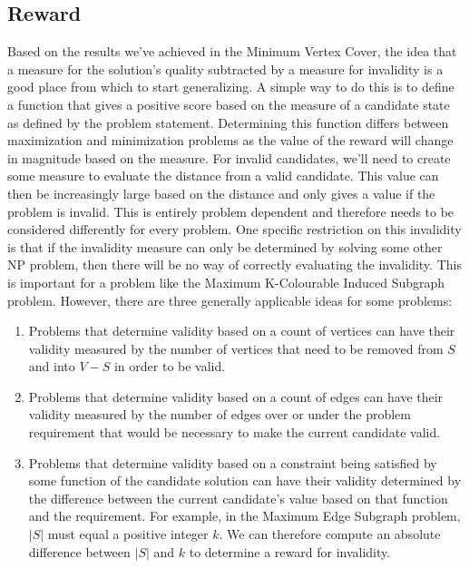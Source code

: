 \documentclass{article}
\begin{document}
\subsection{Reward}\label{sec:reward-generalized}

Based on the results we've achieved in the Minimum Vertex Cover, the idea that a measure for the solution's quality subtracted by a measure for invalidity is a good place from which to start generalizing. A simple way to do this is to define a function that gives a positive score based on the measure of a candidate state as defined by the problem statement. Determining this function differs between maximization and minimization problems as the value of the reward will change in magnitude based on the measure. For invalid candidates, we'll need to create some measure to evaluate the distance from a valid candidate. This value can then be increasingly large based on the distance and only gives a value if the problem is invalid. This is entirely problem dependent and therefore needs to be considered differently for every problem. One specific restriction on this invalidity is that if the invalidity measure can only be determined by solving some other NP problem, then there will be no way of correctly evaluating the invalidity. This is important for a problem like the Maximum K-Colourable Induced Subgraph problem. However, there are three generally applicable ideas for some problems:

\begin{enumerate}
    \item Problems that determine validity based on a count of vertices can have their validity measured by the number of vertices that need to be removed from $S$ and into $V - S$ in order to be valid.
    \item Problems that determine validity based on a count of edges can have their validity measured by the number of edges over or under the problem requirement that would be necessary to make the current candidate valid. 
    \item Problems that determine validity based on a constraint being satisfied by some function of the candidate solution can have their validity determined by the difference between the current candidate's value based on that function and the requirement. For example, in the Maximum Edge Subgraph problem, $|S|$ must equal a positive integer $k$. We can therefore compute an absolute difference between $|S|$ and $k$ to determine a reward for invalidity.
\end{enumerate}
\end{document}
